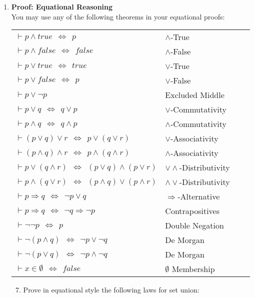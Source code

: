 \documentclass{article}
\renewcommand{\implies}{\Rightarrow}
\renewcommand{\iff}{\Leftrightarrow}
\begin{document}
\begin{enumerate}[\bf I.]
\begin{enumerate}[1.]
\begin{enumerate}[a.]
\end{enumerate}
\end{enumerate}
\clearpage

\item \textbf{Proof: Equational Reasoning} \\[8pt]
You may use any of the following theorems in your equational proofs:

\begin{tabular}{llll}
$\vdash p \land \mathit{true} ~~\iff~~ p$   &$\land$-True\\
$\vdash p \land \mathit{false} ~~\iff~~ \mathit{false}$
&$\land$-False\\
$\vdash p \lor \mathit{true} ~~\iff~~ \mathit{true}$ &$\lor$-True\\
$\vdash p \lor \mathit{false} ~~\iff~~ p$ & $\lor$-False\\
$\vdash p \lor \neg p$  &Excluded Middle\\
$\vdash p \lor q ~~\iff~~ q \lor p$ & $\lor$-Commutativity\\
$\vdash p \land q ~~\iff~~ q \land p$ &$\land$-Commutativity\\
$\vdash (p \lor q) \lor r ~~\iff~~ p \lor (q \lor r)$ &$\lor$-Associativity\\
$\vdash (p \land q) \land r ~~\iff~~ p \land (q \land r)$
&$\land$-Associativity\\
$\vdash p \lor (q \land r) ~~\iff~~ (p \lor q) \land (p \lor r)$
&$\lor\land$-Distributivity\\
$\vdash p \land (q \lor r) ~~\iff~~ (p \land q) \lor (p \land r)$
&$\land\lor$-Distributivity\\
$\vdash p \implies q ~~\iff~~ \neg p \lor q$ &$\implies$-Alternative\\
$\vdash p \implies q ~~\iff~~ \neg q \implies \neg p$
&Contrapositives\\
$\vdash \neg\neg p ~~\iff~~ p$   &Double Negation\\
$\vdash \neg(p \land q) ~~\iff~~ \neg p \lor \neg q$&De Morgan\\
$\vdash \neg(p \lor q) ~~\iff~~ \neg p \land \neg q$& De Morgan\\
$\vdash x\in\emptyset ~~\iff~~ \mathit{false}$& $\emptyset$ Membership\\
\end{tabular}
\begin{enumerate}[1.]\setcounter{enumii}{6}
\item Prove in equational style the following laws for set union:


\end{enumerate}
\end{enumerate}
\end{document}
